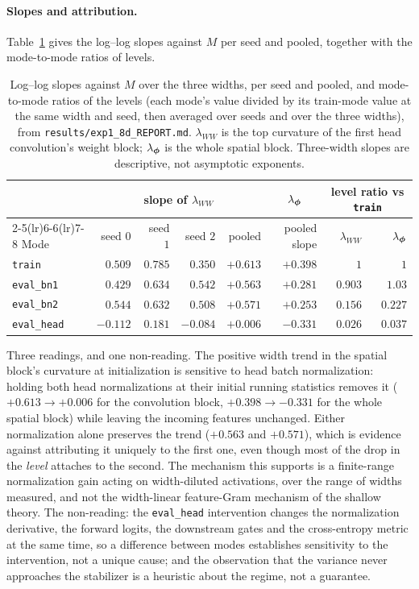 \paragraph{Slopes and attribution.} Table~\ref{tab:app_slopes} gives the
log--log slopes against $M$ per seed and pooled, together with the
mode-to-mode ratios of levels.

\begin{table}[htbp]
\centering
\small
\caption{Log--log slopes against $M$ over the three widths, per seed and
pooled, and mode-to-mode ratios of the levels (each mode's value divided by its
train-mode value at the same width and seed, then averaged over seeds and over
the three widths), from
\texttt{results/exp1\_8d\_REPORT.md}. $\lambda_{WW}$ is the top curvature of
the first head convolution's weight block; $\lambda_{\boldsymbol{\phi}}$ is the whole spatial
block. Three-width slopes are descriptive, not asymptotic exponents.}
\label{tab:app_slopes}
\begin{tabular}{lrrrrrrr}
\toprule
& \multicolumn{4}{c}{slope of $\lambda_{WW}$} & \multicolumn{1}{c}{$\lambda_{\boldsymbol{\phi}}$} & \multicolumn{2}{c}{level ratio vs \texttt{train}} \\
\cmidrule(lr){2-5}\cmidrule(lr){6-6}\cmidrule(lr){7-8}
Mode & seed $0$ & seed $1$ & seed $2$ & pooled & pooled slope & $\lambda_{WW}$ & $\lambda_{\boldsymbol{\phi}}$ \\
\midrule
\texttt{train}     & $0.509$ & $0.785$ & $0.350$ & $+0.613$ & $+0.398$ & $1$ & $1$ \\
\texttt{eval\_bn1} & $0.429$ & $0.634$ & $0.542$ & $+0.563$ & $+0.281$ & $0.903$ & $1.03$ \\
\texttt{eval\_bn2} & $0.544$ & $0.632$ & $0.508$ & $+0.571$ & $+0.253$ & $0.156$ & $0.227$ \\
\texttt{eval\_head} & $-0.112$ & $0.181$ & $-0.084$ & $+0.006$ & $-0.331$ & $0.026$ & $0.037$ \\
\bottomrule
\end{tabular}
\end{table}

Three readings, and one non-reading. The positive width trend in the spatial
block's curvature at initialization is sensitive to head batch normalization:
holding both head normalizations at their initial running statistics removes it
($+0.613 \to +0.006$ for the convolution block, $+0.398 \to -0.331$ for the
whole spatial block) while leaving the incoming features unchanged. Either
normalization alone preserves the trend ($+0.563$ and $+0.571$), which is
evidence against attributing it uniquely to the first one, even though most of
the drop in the \emph{level} attaches to the second. The mechanism this
supports is a finite-range normalization gain acting on width-diluted
activations, over the range of widths measured, and not the width-linear
feature-Gram mechanism of the shallow theory. The non-reading: the
\texttt{eval\_head} intervention changes the normalization derivative, the
forward logits, the downstream gates and the cross-entropy metric at the same
time, so a difference between modes establishes sensitivity to the
intervention, not a unique cause; and the observation that the variance never
approaches the stabilizer is a heuristic about the regime, not a guarantee.

